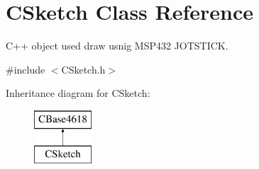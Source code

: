\hypertarget{class_c_sketch}{}\section{C\+Sketch Class Reference}
\label{class_c_sketch}


C++ object used draw usnig M\+S\+P432 J\+O\+T\+S\+T\+I\+CK.  




{\ttfamily \#include $<$C\+Sketch.\+h$>$}

Inheritance diagram for C\+Sketch\+:\begin{figure}[H]
\begin{center}
\leavevmode
\includegraphics[height=2.000000cm]{class_c_sketch}
\end{center}
\end{figure}
